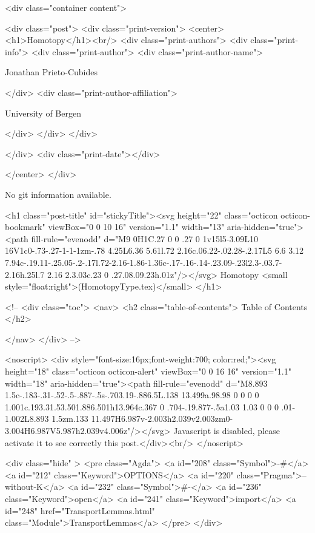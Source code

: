       <div class="container content">
        







<div class="post">
  <div class="print-version">
    <center>
      <h1>Homotopy</h1><br/>
        <div class="print-authors">
          <div class="print-info">
            <div class="print-author">
              <div class="print-author-name">
                
                  Jonathan Prieto-Cubides
                
              </div>
              <div class="print-author-affiliation">
                
                  University of Bergen
                
                </div>
            </div>
          </div>
          
          
        </div>
        <div class="print-date"></div>
        
        
    </center>
  </div>

  
  No git information available.
  

  <h1 class="post-title" id="stickyTitle"><svg height="22" class="octicon octicon-bookmark" viewBox="0 0 10 16" version="1.1" width="13" aria-hidden="true"><path fill-rule="evenodd" d="M9 0H1C.27 0 0 .27 0 1v15l5-3.09L10 16V1c0-.73-.27-1-1-1zm-.78 4.25L6.36 5.61l.72 2.16c.06.22-.02.28-.2.17L5 6.6 3.12 7.94c-.19.11-.25.05-.2-.17l.72-2.16-1.86-1.36c-.17-.16-.14-.23.09-.23l2.3-.03.7-2.16h.25l.7 2.16 2.3.03c.23 0 .27.08.09.23h.01z"/></svg> Homotopy <small style="float:right">(HomotopyType.tex)</small>
  </h1>

  <!-- 
  <div class="toc">
    <nav>
    <h2 class="table-of-contents"> Table of Contents </h2>
      

    </nav>
  </div>
   -->

  <noscript>
  <div style="font-size:16px;font-weight:700; color:red;"><svg height="18" class="octicon octicon-alert" viewBox="0 0 16 16" version="1.1" width="18" aria-hidden="true"><path fill-rule="evenodd" d="M8.893 1.5c-.183-.31-.52-.5-.887-.5s-.703.19-.886.5L.138 13.499a.98.98 0 0 0 0 1.001c.193.31.53.501.886.501h13.964c.367 0 .704-.19.877-.5a1.03 1.03 0 0 0 .01-1.002L8.893 1.5zm.133 11.497H6.987v-2.003h2.039v2.003zm0-3.004H6.987V5.987h2.039v4.006z"/></svg> Javascript is disabled, please activate it to see correctly this post.</div><br/>
  </noscript>

  <div class="hide" >
<pre class="Agda">
<a id="208" class="Symbol">{-#</a> <a id="212" class="Keyword">OPTIONS</a> <a id="220" class="Pragma">--without-K</a> <a id="232" class="Symbol">#-}</a>
<a id="236" class="Keyword">open</a> <a id="241" class="Keyword">import</a> <a id="248" href="TransportLemmas.html" class="Module">TransportLemmas</a>
</pre>
</div>

